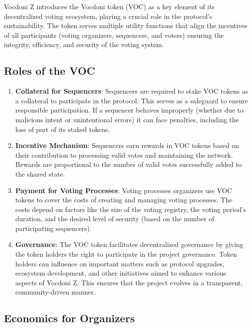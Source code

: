 
Vocdoni Z introduces the Vocdoni token (VOC) as a key element of its decentralized voting ecosystem, playing a crucial role in the protocol's sustainability.
The token serves multiple utility functions that align the incentives of all participants (voting organizers, sequencers, and voters) ensuring the integrity, efficiency, and security of the voting system.

\subsection{Roles of the VOC}

\begin{enumerate}
	\item \textbf{Collateral for Sequencers}: Sequencers are required to stake VOC tokens as a collateral to participate in the protocol. This serves as a safeguard to ensure responsible participation. If a sequencer behaves improperly (whether due to malicious intent or unintentional errors) it can face penalties, including the loss of part of its staked tokens.
	\item \textbf{Incentive Mechanism}: Sequencers earn rewards in VOC tokens based on their contribution to processing valid votes and maintaining the network. Rewards are proportional to the number of valid votes successfully added to the shared state.
	\item \textbf{Payment for Voting Processes}: Voting processes organizers use VOC tokens to cover the costs of creating and managing voting processes. The costs depend on factors like the size of the voting registry, the voting period's duration, and the desired level of security (based on the number of participating sequencers).
	\item \textbf{Governance}: The VOC token facilitates decentralized governance by giving the token holders the right to participate in the project governance. Token holders can influence on important matters such as protocol upgrades, ecosystem development, and other initiatives aimed to enhance various aspects of Vocdoni Z. This ensures that the project evolves in a transparent, community-driven manner.
\end{enumerate}

\subsection{Economics for Organizers}


